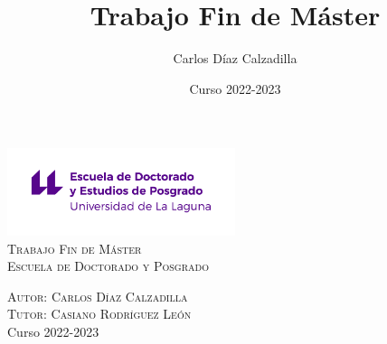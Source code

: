 \documentclass{beamer}
\begin{document}

\title{Trabajo Fin de Máster}
\author{Carlos Díaz Calzadilla}

\date{Curso 2022-2023}


\newcommand{\HRule}{\rule{\linewidth}{0.75mm}}

\begin{frame}
\begin{center}
\thispagestyle{empty}

	\includegraphics[width=0.5\textwidth]{Presentacion/escuela-doctorado-posgrado-original.png}\\
	\textsc{\Large Trabajo Fin de Máster}\\
	\vspace{0.25cm}
	\textsc{\Large Escuela de Doctorado y Posgrado}\\
	\vspace{0.5cm}
	\begin{huge}
	\begin{alertblock}{}
		\vspace{0.4cm}
		\vspace{0.4cm}
	\end{alertblock}
	\end{huge}
	\textsc{Autor: Carlos Díaz Calzadilla}\\
	\textsc{Tutor: Casiano Rodríguez León}\\
	\vspace{0.5cm}
	\footnotesize{Curso 2022-2023}
\end{center}
\end{frame}
\end{document}
